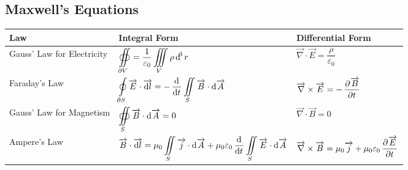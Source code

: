 \documentclass[fleqn, a4paper, 12pt, twoside]{article}
\theoremstyle{definition}
\theoremstyle{theorem}
\begin{document}
\begin{landscape}

\doublespacing

\section{Maxwell's Equations}

\begin{tabular}{|l||l|l|}
	\hline
	Law                        & Integral Form                                                                                                                                                                                                                               & Differential Form                                                                                                                \\ [1.5ex]
	\hline
	Gauss' Law for Electricity & $\displaystyle \oiint\limits_{\partial V} = \dfrac{1}{\varepsilon_0} \iiint\limits_{V} \rho \dif^3 r$                                                                                                                                       & $\overrightarrow{\nabla} \cdot \overrightarrow{E} = \dfrac{\rho}{\varepsilon_0}$                                                 \\ [1.5ex]

	Faraday's Law              & $\displaystyle \oint\limits_{\partial S} \overrightarrow{E} \cdot \overrightarrow{\dif l} = -\dod{}{t} \iint\limits_{S} \overrightarrow{B} \cdot \dif \overrightarrow{A}$                                                                   & $\overrightarrow{\nabla} \times \overrightarrow{E} = -\dpd{\overrightarrow{B}}{t}$                                               \\ [1.5ex]

	Gauss' Law for Magnetism   & $\displaystyle \oiint\limits_{S} \overrightarrow{B} \cdot \dif \overrightarrow{A} = 0$                                                                                                                                                      & $\overrightarrow{\nabla} \cdot \overrightarrow{B} = 0$                                                                           \\ [1.5ex]

	Ampere's Law               & $\displaystyle \overrightarrow{B} \cdot \overrightarrow{\dif l} = \mu_0 \iint\limits_{S} \overrightarrow{j} \cdot \dif \overrightarrow{A} + \mu_0 \varepsilon_0 \dod{}{t}\iint\limits_{S} \overrightarrow{E} \cdot \dif \overrightarrow{A}$ & $\overrightarrow{\nabla} \times \overrightarrow{B} = \mu_0 \overrightarrow{j} + \mu_0 \varepsilon_0 \dpd{\overrightarrow{E}}{t}$ \\ [1.5ex]

	\hline
\end{tabular}

\end{landscape}
\end{document}
